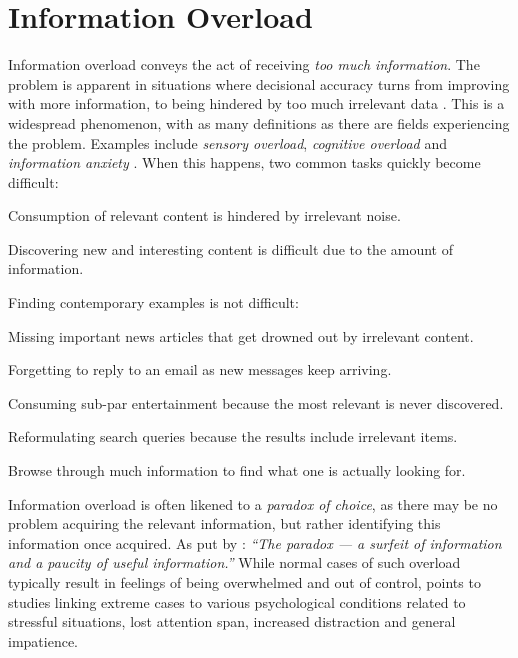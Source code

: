 \section{Information Overload}

Information overload conveys the act of receiving \emph{too much information}. 
The problem is apparent in situations where decisional accuracy turns from improving with more information, 
to being hindered by too much irrelevant data \cite[p.13]{Bjorkoy2010d}. 
This is a widespread phenomenon, with as many definitions as there are fields experiencing the problem. 
Examples include \emph{sensory overload}, \emph{cognitive overload} and \emph{information anxiety} \cite[p.2]{Eppler2004}.
When this happens, two common tasks quickly become difficult:

\begin{enumerate*}
  \item Consumption of relevant content is hindered by irrelevant noise.
  \item Discovering new and interesting content is difficult due to the amount of information.
\end{enumerate*}

\noindent
Finding contemporary examples is not difficult:

\begin{itemize*}
  \item Missing important news articles that get drowned out by irrelevant content.
  \item Forgetting to reply to an email as new messages keep arriving.
  \item Consuming sub-par entertainment because the most relevant is never discovered.
  \item Reformulating search queries because the results include irrelevant items.
  \item Browse through much information to find what one is actually looking for.
\end{itemize*}

Information overload is often likened to a \emph{paradox of choice}, as there may be no problem acquiring the relevant information, 
but rather identifying this information once acquired. As put by \cite[p.6]{Edmunds2000}: 
\emph{``The paradox --- a surfeit of information and a paucity of useful information.''}
While normal cases of such overload typically result in feelings of being overwhelmed and out of control, 
\citet[p.5]{Bawden2008} points to studies linking extreme cases to various psychological conditions 
related to stressful situations, lost attention span, increased distraction and general impatience.

